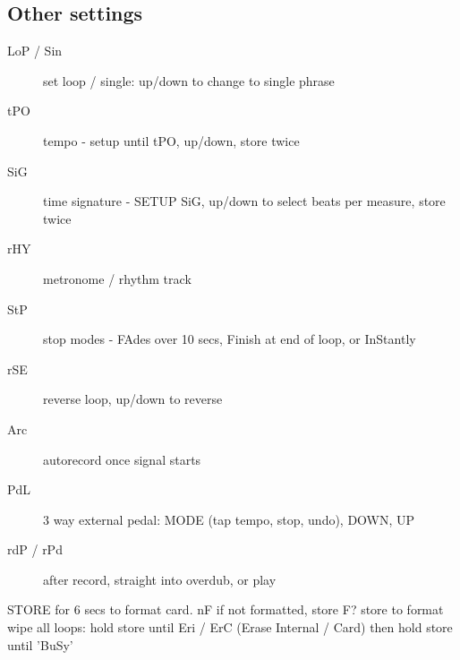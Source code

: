 \documentclass{tufte-handout}
\begin{document}
\subsection{Other settings}
\begin{description}
\item[{\selectfont LoP / Sin}] set loop / single:  up/down to change to single phrase
\item[{\selectfont tPO}] tempo - setup until {\selectfont tPO}, up/down, store twice
\item[{\selectfont SiG}] time signature - SETUP {\selectfont SiG}, up/down to select beats per measure, store twice
\item[{\selectfont rHY}] metronome / rhythm track
\item[{\selectfont StP}] stop modes - {\selectfont FAd}es over 10 secs, {\selectfont Fin}ish at end of loop, or {\selectfont InS}tantly
\item[{\selectfont rSE}] reverse loop, up/down to reverse
\item[{\selectfont Arc}] autorecord once signal starts 
\item[{\selectfont PdL}] 3 way external pedal: MODE (tap tempo, stop, undo), DOWN, UP
\item[{\selectfont rdP / rPd}] after record, straight into overdub, or play
\end{description}

STORE for 6 secs to format card. {\selectfont nF} if not formatted, store {\selectfont F?} store to format \\
wipe all loops: hold store until {\selectfont Eri / ErC} (Erase Internal / Card) then hold store until {\selectfont 'BuS}y' \\
\end{document}
